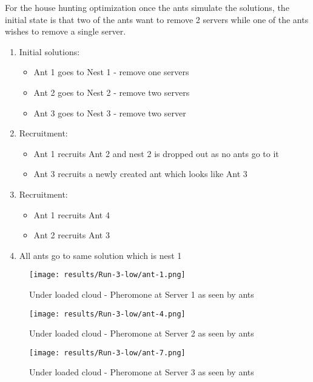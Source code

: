 For the house hunting optimization once the ants simulate the solutions, the initial state is that two of the ants want to remove 2 servers while one of the ants wishes to remove a single server.

\begin{enumerate}
	\item Initial solutions: 
	\begin{itemize}
		\item Ant 1 goes to Nest 1 - remove one servers
		\item Ant 2 goes to Nest 2 - remove two servers
		\item Ant 3 goes to Nest 3 - remove two server
	\end{itemize}
	\item Recruitment:
	\begin{itemize}
		\item Ant 1 recruits Ant 2 and nest 2 is dropped out as no ants go to it
		\item Ant 3 recruits a newly created ant which looks like Ant 3
	\end{itemize}
	\item Recruitment:
	\begin{itemize}
		\item Ant 1 recruits Ant 4
		\item Ant 2 recruits Ant 3
	\end{itemize}
	\item All ants go to same solution which is nest 1
\end{enumerate}

\begin{figure}[!ht]
	\centering
		\texttt{[image: results/Run-3-low/ant-1.png]}
	\caption{Under loaded cloud - Pheromone at Server 1 as seen by ants}
	\label{fig:3serv-ant1-low}
\end{figure}

\begin{figure}
	\centering
		\texttt{[image: results/Run-3-low/ant-4.png]}
	\caption{Under loaded cloud - Pheromone at Server 2 as seen by ants}
	\label{fig:3serv-ant4-low}
\end{figure}

\begin{figure}
	\centering
		\texttt{[image: results/Run-3-low/ant-7.png]}
	\caption{Under loaded cloud - Pheromone at Server 3 as seen by ants}
	\label{fig:3serv-ant7-low}
\end{figure}

